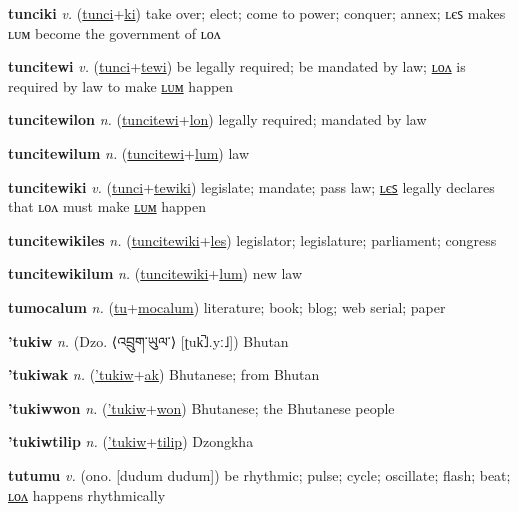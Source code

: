 \textbf{\hypertarget{tunciki}{tunciki}} \textit{v.} (\hyperlink{tunci}{tunci}+\allowbreak \hyperlink{ki}{ki})
take over; elect; come to power; conquer; annex; ʟєꜱ makes ʟᴜᴍ become the government of ʟᴏᴧ

\textbf{\hypertarget{tuncitewi}{tuncitewi}} \textit{v.} (\hyperlink{tunci}{tunci}+\allowbreak \hyperlink{tewi}{tewi})
be legally required; be mandated by law; \hyperlink{tuncitewilon}{ʟᴏᴧ} is required by law to make \hyperlink{tuncitewilum}{ʟᴜᴍ} happen

\textbf{\hypertarget{tuncitewilon}{tuncitewilon}} \textit{n.} (\hyperlink{tuncitewi}{tuncitewi}+\allowbreak \hyperlink{lon}{lon})
legally required; mandated by law

\textbf{\hypertarget{tuncitewilum}{tuncitewilum}} \textit{n.} (\hyperlink{tuncitewi}{tuncitewi}+\allowbreak \hyperlink{lum}{lum})
law

\textbf{\hypertarget{tuncitewiki}{tuncitewiki}} \textit{v.} (\hyperlink{tunci}{tunci}+\allowbreak \hyperlink{tewiki}{tewiki})
legislate; mandate; pass law; \hyperlink{tuncitewikiles}{ʟєꜱ} legally declares that ʟᴏᴧ must make \hyperlink{tuncitewikilum}{ʟᴜᴍ} happen

\textbf{\hypertarget{tuncitewikiles}{tuncitewikiles}} \textit{n.} (\hyperlink{tuncitewiki}{tuncitewiki}+\allowbreak \hyperlink{les}{les})
legislator; legislature; parliament; congress

\textbf{\hypertarget{tuncitewikilum}{tuncitewikilum}} \textit{n.} (\hyperlink{tuncitewiki}{tuncitewiki}+\allowbreak \hyperlink{lum}{lum})
new law

\textbf{\hypertarget{tumocalum}{tumocalum}} \textit{n.} (\hyperlink{tu}{tu}+\allowbreak \hyperlink{mocalum}{mocalum})
literature; book; blog; web serial; paper

\textbf{\hypertarget{'tukiw}{'tukiw}} \textit{n.} (Dzo. ⟨{\tibetan{}འབྲུག་ཡུལ་}⟩ [ʈuk̚˩.yː˩])
Bhutan

\textbf{\hypertarget{'tukiwak}{'tukiwak}} \textit{n.} (\hyperlink{'tukiw}{'tukiw}+\allowbreak \hyperlink{ak}{ak})
Bhutanese; from Bhutan

\textbf{\hypertarget{'tukiwwon}{'tukiwwon}} \textit{n.} (\hyperlink{'tukiw}{'tukiw}+\allowbreak \hyperlink{won}{won})
Bhutanese; the Bhutanese people

\textbf{\hypertarget{'tukiwtilip}{'tukiwtilip}} \textit{n.} (\hyperlink{'tukiw}{'tukiw}+\allowbreak \hyperlink{tilip}{tilip})
Dzongkha

\textbf{\hypertarget{tutumu}{tutumu}} \textit{v.} (ono. [dudum dudum])
be rhythmic; pulse; cycle; oscillate; flash; beat; \hyperlink{tutumulon}{ʟᴏᴧ} happens rhythmically

